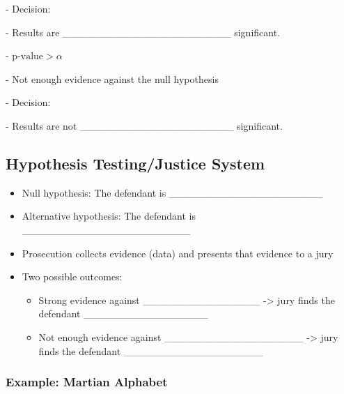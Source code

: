 \documentclass[
]{report}
\newcommand{\rgi}{\hspace{24pt}}  %
\begin{document}
\rgi \rgi \rgi - Decision:

\vspace{0.2in}

\rgi \rgi \rgi - Results are \_\_\_\_\_\_\_\_\_\_\_\_\_\_\_\_\_\_\_\_\_\_\_ significant.

\rgi \rgi - \(\text{p-value} > \alpha\)

\rgi \rgi \rgi - Not enough evidence against the null hypothesis

\rgi \rgi \rgi - Decision:

\vspace{0.17in}

\rgi \rgi \rgi - Results are not \_\_\_\_\_\_\_\_\_\_\_\_\_\_\_\_\_\_\_\_\_ significant.


\subsection*{Hypothesis Testing/Justice System}\label{hypothesis-testingjustice-system}


\begin{itemize}
\item
  Null hypothesis: The defendant is \_\_\_\_\_\_\_\_\_\_\_\_\_\_\_\_\_\_\_\_\_
\item
  Alternative hypothesis: The defendant is \_\_\_\_\_\_\_\_\_\_\_\_\_\_\_\_\_\_\_\_\_\_\_
\item
  Prosecution collects evidence (data) and presents that evidence to a jury
\item
  Two possible outcomes:

  \begin{itemize}
  \item
    Strong evidence against \_\_\_\_\_\_\_\_\_\_\_\_\_\_\_\_ -\textgreater{} jury finds the defendant \_\_\_\_\_\_\_\_\_\_\_\_\_\_\_\_\_
  \item
    Not enough evidence against \_\_\_\_\_\_\_\_\_\_\_\_\_\_\_\_\_\_\_ -\textgreater{} jury finds the defendant \_\_\_\_\_\_\_\_\_\_\_\_\_\_\_\_\_\_\_
  \end{itemize}
\end{itemize}

\subsubsection*{Example: Martian Alphabet}\label{example-martian-alphabet}
\end{document}
